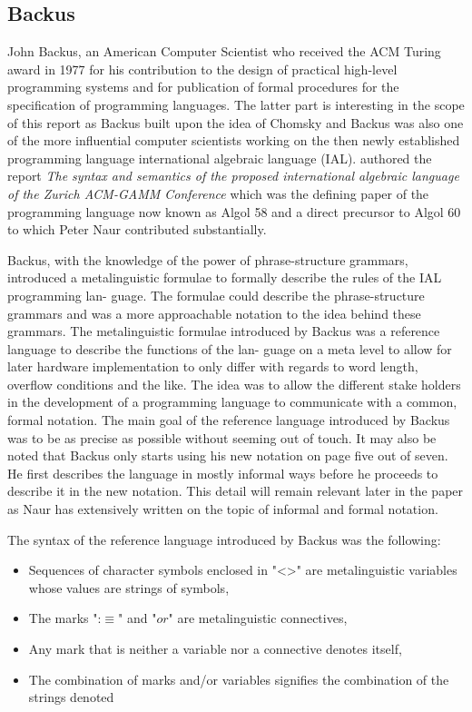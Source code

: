 \documentclass{article}
\begin{document}
\subsection{Backus}
John Backus, an American Computer Scientist who received the ACM Turing award in 1977 for his contribution to the design of practical high-level programming systems and for publication of formal procedures for the specification of programming languages. The latter part is interesting in the scope of this report as Backus built upon the idea of Chomsky and Backus was also one of the more influential computer scientists working on the then newly established programming language international algebraic language (IAL). \cite{Backus1959TheSA} authored the report \textit{The syntax and semantics of the proposed international algebraic language of the Zurich ACM-GAMM Conference} which was the defining paper of the programming language now known as Algol 58 and a direct precursor to Algol 60 to which Peter Naur contributed substantially.

Backus, with the knowledge of the power of phrase-structure grammars, introduced a metalinguistic formulae to formally describe the rules of the IAL programming lan- guage. The formulae could describe the phrase-structure grammars and was a more approachable notation to the idea behind these grammars. The metalinguistic formulae introduced by Backus was a reference language to describe the functions of the lan- guage on a meta level to allow for later hardware implementation to only differ with regards to word length, overflow conditions and the like. The idea was to allow the different stake holders in the development of a programming language to communicate with a common, formal notation. The main goal of the reference language introduced by Backus was to be as precise as possible without seeming out of touch. It may also be noted that Backus only starts using his new notation on page five out of seven. He first describes the language in mostly informal ways before he proceeds to describe it in the new notation. This detail will remain relevant later in the paper as Naur has extensively written on the topic of informal and formal notation.

The syntax of the reference language introduced by Backus was the following:
\begin{itemize}
	\item Sequences of character symbols enclosed in "<>" are metalinguistic variables whose values are strings of symbols,
	\item The marks ":$\equiv$" and "$or$" are metalinguistic connectives,
	\item Any mark that is neither a variable nor a connective denotes itself,
	\item The combination of marks and/or variables signifies the combination of the strings denoted
\end{itemize} 
\end{document}
